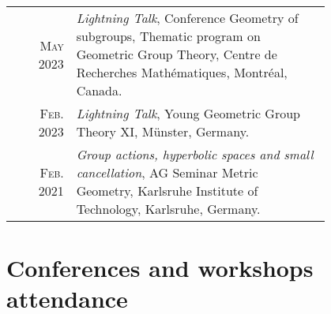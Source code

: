\documentclass[a4paper,11pt]{article} %
\begin{document}
\begin{longtable}{rp{0.8\linewidth}}

    \textsc{May 2023} & \emph{Lightning Talk}, Conference Geometry of subgroups, Thematic program on Geometric Group Theory, Centre de Recherches Mathématiques, Montréal, Canada. \\

    \textsc{Feb. 2023} & \emph{Lightning Talk}, Young Geometric Group Theory XI, Münster, Germany.\\



    \textsc{Feb. 2021} & \emph{Group actions, hyperbolic spaces and small cancellation}, AG Seminar Metric Geometry, Karlsruhe Institute of Technology, Karlsruhe, Germany.\\
\end{longtable}


\section{Conferences and workshops attendance}
\end{document}
